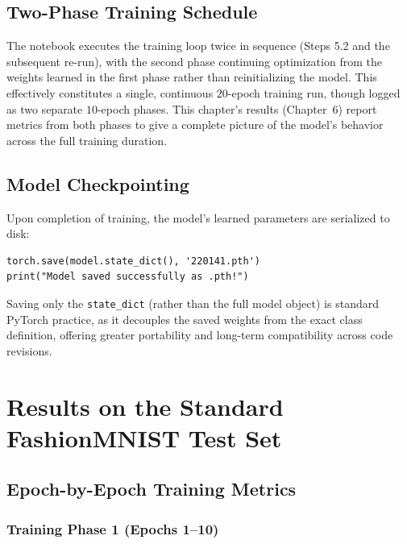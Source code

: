 \documentclass[12pt,a4paper]{report}
\begin{document}
\section{Two-Phase Training Schedule}
The notebook executes the training loop twice in sequence (Steps 5.2 and the subsequent re-run), with the second phase continuing optimization from the weights learned in the first phase rather than reinitializing the model. This effectively constitutes a single, continuous $20$-epoch training run, though logged as two separate $10$-epoch phases. This chapter's results (Chapter~6) report metrics from both phases to give a complete picture of the model's behavior across the full training duration.

\section{Model Checkpointing}
Upon completion of training, the model's learned parameters are serialized to disk:

\begin{lstlisting}[caption={Model checkpoint saving}]
torch.save(model.state_dict(), '220141.pth')
print("Model saved successfully as .pth!")
\end{lstlisting}

Saving only the \texttt{state\_dict} (rather than the full model object) is standard PyTorch practice, as it decouples the saved weights from the exact class definition, offering greater portability and long-term compatibility across code revisions.

\chapter{Results on the Standard FashionMNIST Test Set}

\section{Epoch-by-Epoch Training Metrics}

\subsection{Training Phase 1 (Epochs 1--10)}
\end{document}
